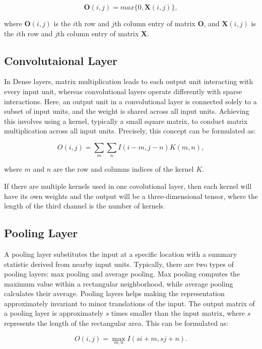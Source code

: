 \documentclass[]{interact}
\theoremstyle{plain}%
\theoremstyle{definition}
\theoremstyle{remark}
\begin{document}
\[\boldsymbol{O}(i,j) = max\{0, \boldsymbol{X}(i,j)\},\]

where \(\boldsymbol{O}(i,j)\) is the \(i\)th row and \(j\)th column
entry of matrix \(\boldsymbol{O}\), and \(\boldsymbol{X}(i,j)\) is the
\(i\)th row and \(j\)th column entry of matrix \(\boldsymbol{X}\).

\subsection{Convolutaional Layer}\label{convolutaional-layer}

In Dense layers, matrix multiplication leads to each output unit
interacting with every input unit, whereas convolutional layers operate
differently with sparse interactions. Here, an output unit in a
convolutional layer is connected solely to a subset of input units, and
the weight is shared across all input units. Achieving this involves
using a kernel, typically a small square matrix, to conduct matrix
multiplication across all input units. Precisely, this concept can be
formulated as:

\[O(i, j) = \sum_m\sum_nI(i - m, j - n)K(m, n),\]

where \(m\) and \(n\) are the row and columns indices of the kernel
\(K\).

If there are multiple kernels used in one covolutional layer, then each
kernel will have its own weights and the output will be a
three-dimensional tensor, where the length of the third channel is the
number of kernels.

\subsection{Pooling Layer}\label{pooling-layer}

A pooling layer substitutes the input at a specific location with a
summary statistic derived from nearby input units. Typically, there are
two types of pooling layers: max pooling and average pooling. Max
pooling computes the maximum value within a rectangular neighborhood,
while average pooling calculates their average. Pooling layers helps
making the representation approximately invariant to minor translations
of the input. The output matrix of a pooling layer is approximately
\(s\) times smaller than the input matrix, where \(s\) represents the
length of the rectangular area. This can be formulated as:

\[O(i, j) = \underset{m,n}{\max} I(si + m,sj+n).\]
\end{document}
